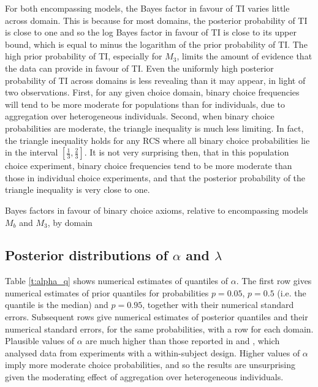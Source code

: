 \documentclass[11pt,letter]{article}
\begin{document}
For both encompassing models, the Bayes factor in favour of TI varies little across domain.
This is because for most domains, the posterior probability of TI is close to one and so the log Bayes factor in favour of TI is close to its upper bound, which is equal to minus the logarithm of the prior probability of TI.
The high prior probability of TI, especially for $M_3$, limits the amount of evidence that the data can provide in favour of TI.
Even the uniformly high posterior probability of TI across domains is less revealing than it may appear, in light of two observations.
First, for any given choice domain, binary choice frequencies will tend to be more moderate for populations than for individuals, due to aggregation over heterogeneous individuals.
Second, when binary choice probabilities are moderate, the triangle inequality is much less limiting.
In fact, the triangle inequality holds for any RCS where all binary choice probabilities lie in the interval $[\tfrac{1}{3},\tfrac{2}{3}]$.
It is not very surprising then, that in this population choice experiment, binary choice frequencies tend to be more moderate than those in individual choice experiments, and that the posterior probability of the triangle inequality is very close to one.

\begin{table}
  
  \caption{Bayes factors in favour of binary choice axioms, relative to encompassing models $M_b$ and $M_3$, by domain}
  \label{t:bin}
\end{table}

\subsection{Posterior distributions of $\alpha$ and $\lambda$}

Table \ref{t:alpha_q} shows numerical estimates of quantiles of $\alpha$.
The first row gives numerical estimates of prior quantiles for probabilities $p=0.05$, $p=0.5$ (i.e. the quantile is the median) and $p=0.95$, together with their numerical standard errors.
Subsequent rows give numerical estimates of posterior quantiles and their numerical standard errors, for the same probabilities, with a row for each domain.
Plausible values of $\alpha$ are much higher than those reported in  and , which analysed data from experiments with a within-subject design.
Higher values of $\alpha$ imply more moderate choice probabilities, and so the results are unsurprising given the moderating effect of aggregation over heterogeneous individuals.
\end{document}
